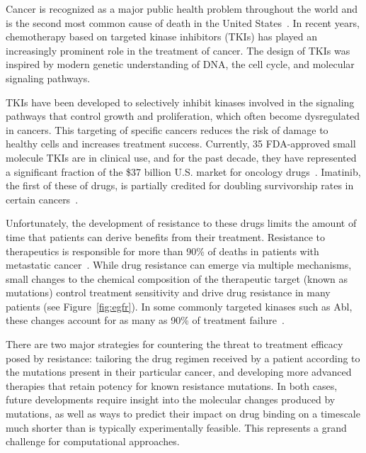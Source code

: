 Cancer is recognized as a major public health problem throughout the world
and is the second most common cause of death in the United
States~\cite{Siegel2016}. In recent years, chemotherapy based on targeted
kinase inhibitors (TKIs) has played an increasingly prominent role in the
treatment of cancer. The design of TKIs was inspired by modern genetic
understanding of DNA, the cell cycle, and molecular signaling pathways.

TKIs have been developed to selectively inhibit kinases involved in the
signaling pathways that control growth and proliferation, which often become
dysregulated in cancers. This targeting of specific cancers reduces the risk
of damage to healthy cells and increases treatment success. Currently, 35
FDA-approved small molecule TKIs are in clinical use, and for the past
decade, they have represented a significant fraction of the \$37 billion U.S.
market for oncology drugs~\cite{FDA, Zhao2014}. Imatinib, the first of these
of drugs, is partially credited for doubling survivorship rates in certain
cancers~\cite{Zhao2014, ACSreport}. 

Unfortunately, the development of resistance to these drugs limits the amount
of time that patients can derive benefits from their treatment. Resistance to
therapeutics is responsible for more than 90\% of deaths in patients with
metastatic cancer~\cite{Longley2005}. While drug resistance can emerge via
multiple mechanisms, small changes to the chemical composition of the
therapeutic target (known as mutations) control treatment sensitivity and
drive drug resistance in many patients (see Figure~\ref{fig:egfr}). In some
commonly targeted kinases such as Abl, these changes account for as many as
90\% of treatment failure~\cite{Shah2002}.


There are two major strategies for countering the threat to treatment
efficacy posed by resistance: tailoring the drug regimen received by a
patient according to the mutations present in their particular cancer, and
developing more advanced %
therapies that retain potency for known resistance mutations. In both cases,
future developments require insight into the molecular changes produced by
mutations, as well as ways to predict their impact on drug binding on a
timescale much shorter than is typically experimentally feasible. This
represents a grand challenge for computational approaches.

